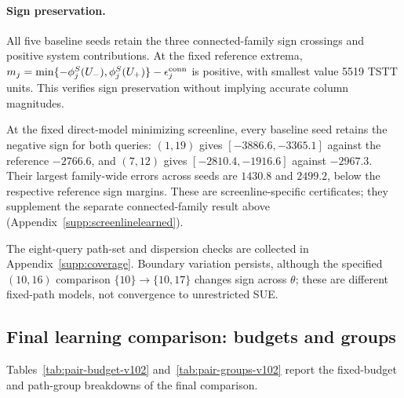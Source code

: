 \paragraph{Sign preservation.}\label{subsec:precision}
All five baseline seeds retain the three connected-family sign crossings
and positive system contributions. At the fixed reference extrema,
$m_j=\min\{-\phi_j^S(U_-),\phi_j^S(U_+)\}-\epsilon_j^{\rm conn}$
is positive, with smallest value 5519 TSTT units. This verifies sign
preservation without implying accurate column magnitudes.

At the fixed direct-model minimizing screenline, every baseline seed
retains the negative sign for both queries: $(1,19)$ gives
$[-3886.6,-3365.1]$ against the reference $-2766.6$, and $(7,12)$
gives $[-2810.4,-1916.6]$ against $-2967.3$. Their largest family-wide
errors across seeds are $1430.8$ and $2499.2$, below the respective
reference sign margins. These are screenline-specific certificates;
they supplement the separate connected-family result above
(Appendix~\ref{supp:screenlinelearned}).


The eight-query path-set and dispersion checks are collected in
Appendix~\ref{supp:coverage}. Boundary variation persists, although
the specified $(10,16)$ comparison $\{10\}\to\{10,17\}$ changes sign
across $\theta$; these are different fixed-path models, not convergence
to unrestricted SUE.

\subsection{Final learning comparison: budgets and groups}
Tables~\ref{tab:pair-budget-v102} and~\ref{tab:pair-groups-v102} report the fixed-budget and path-group breakdowns of the final comparison.


